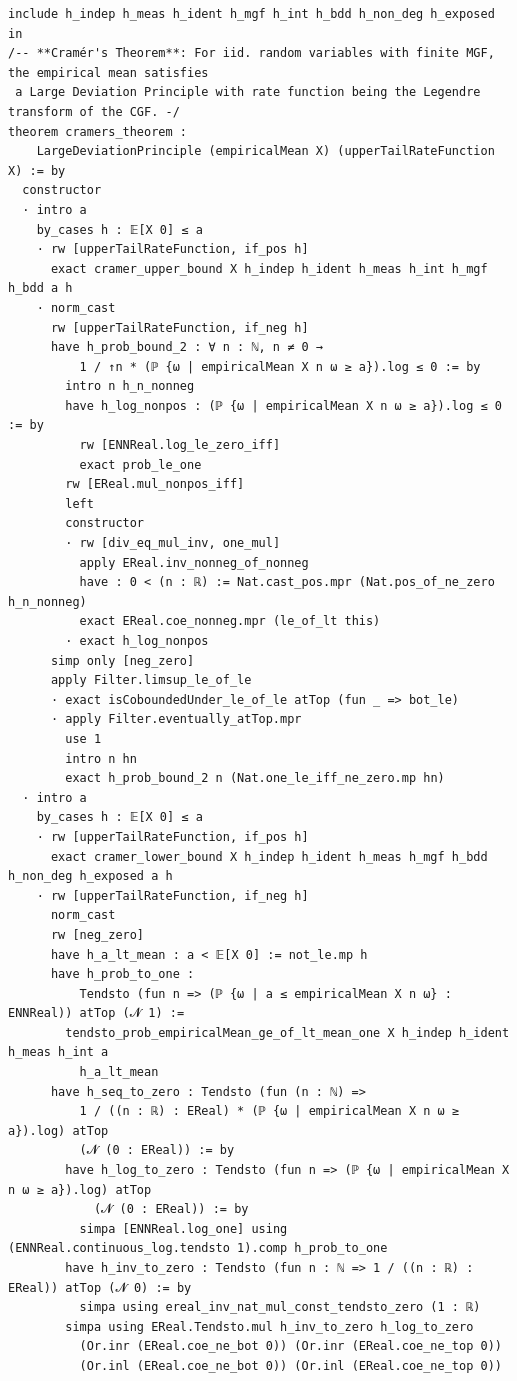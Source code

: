 \begin{lstlisting}
include h_indep h_meas h_ident h_mgf h_int h_bdd h_non_deg h_exposed in
/-- **Cramér's Theorem**: For iid. random variables with finite MGF, the empirical mean satisfies
 a Large Deviation Principle with rate function being the Legendre transform of the CGF. -/
theorem cramers_theorem :
    LargeDeviationPrinciple (empiricalMean X) (upperTailRateFunction X) := by
  constructor
  · intro a
    by_cases h : 𝔼[X 0] ≤ a
    · rw [upperTailRateFunction, if_pos h]
      exact cramer_upper_bound X h_indep h_ident h_meas h_int h_mgf h_bdd a h
    · norm_cast
      rw [upperTailRateFunction, if_neg h]
      have h_prob_bound_2 : ∀ n : ℕ, n ≠ 0 →
          1 / ↑n * (ℙ {ω | empiricalMean X n ω ≥ a}).log ≤ 0 := by
        intro n h_n_nonneg
        have h_log_nonpos : (ℙ {ω | empiricalMean X n ω ≥ a}).log ≤ 0 := by
          rw [ENNReal.log_le_zero_iff]
          exact prob_le_one
        rw [EReal.mul_nonpos_iff]
        left
        constructor
        · rw [div_eq_mul_inv, one_mul]
          apply EReal.inv_nonneg_of_nonneg
          have : 0 < (n : ℝ) := Nat.cast_pos.mpr (Nat.pos_of_ne_zero h_n_nonneg)
          exact EReal.coe_nonneg.mpr (le_of_lt this)
        · exact h_log_nonpos
      simp only [neg_zero]
      apply Filter.limsup_le_of_le
      · exact isCoboundedUnder_le_of_le atTop (fun _ => bot_le)
      · apply Filter.eventually_atTop.mpr
        use 1
        intro n hn
        exact h_prob_bound_2 n (Nat.one_le_iff_ne_zero.mp hn)
  · intro a
    by_cases h : 𝔼[X 0] ≤ a
    · rw [upperTailRateFunction, if_pos h]
      exact cramer_lower_bound X h_indep h_ident h_meas h_mgf h_bdd h_non_deg h_exposed a h
    · rw [upperTailRateFunction, if_neg h]
      norm_cast
      rw [neg_zero]
      have h_a_lt_mean : a < 𝔼[X 0] := not_le.mp h
      have h_prob_to_one :
          Tendsto (fun n => (ℙ {ω | a ≤ empiricalMean X n ω} : ENNReal)) atTop (𝓝 1) :=
        tendsto_prob_empiricalMean_ge_of_lt_mean_one X h_indep h_ident h_meas h_int a
          h_a_lt_mean
      have h_seq_to_zero : Tendsto (fun (n : ℕ) =>
          1 / ((n : ℝ) : EReal) * (ℙ {ω | empiricalMean X n ω ≥ a}).log) atTop
          (𝓝 (0 : EReal)) := by
        have h_log_to_zero : Tendsto (fun n => (ℙ {ω | empiricalMean X n ω ≥ a}).log) atTop
            (𝓝 (0 : EReal)) := by
          simpa [ENNReal.log_one] using (ENNReal.continuous_log.tendsto 1).comp h_prob_to_one
        have h_inv_to_zero : Tendsto (fun n : ℕ => 1 / ((n : ℝ) : EReal)) atTop (𝓝 0) := by
          simpa using ereal_inv_nat_mul_const_tendsto_zero (1 : ℝ)
        simpa using EReal.Tendsto.mul h_inv_to_zero h_log_to_zero
          (Or.inr (EReal.coe_ne_bot 0)) (Or.inr (EReal.coe_ne_top 0))
          (Or.inl (EReal.coe_ne_bot 0)) (Or.inl (EReal.coe_ne_top 0))
\end{lstlisting}
